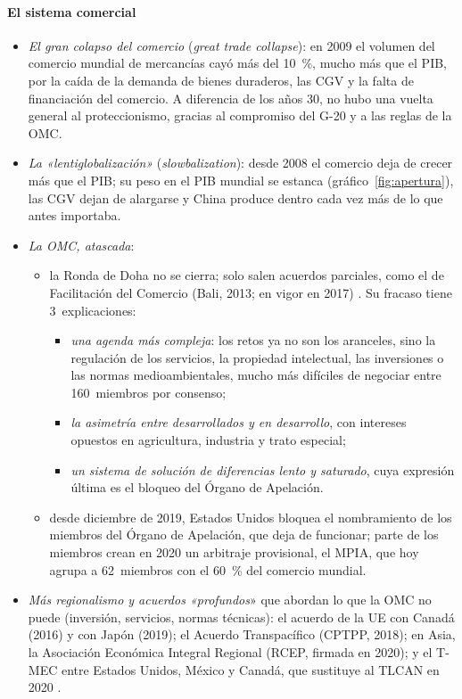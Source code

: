 \documentclass[11pt]{article}
\begin{document}
\paragraph{El sistema comercial}

\begin{itemize}
\item \emph{El gran colapso del comercio} (\emph{great trade collapse}): en 2009 el volumen del comercio mundial de mercancías cayó más del 10~\%, mucho más que el PIB, por la caída de la demanda de bienes duraderos, las CGV y la falta de financiación del comercio. A diferencia de los años 30, no hubo una vuelta general al proteccionismo, gracias al compromiso del G-20 y a las reglas de la OMC.
\item \emph{La «lentiglobalización»} (\emph{slowbalization}): desde 2008 el comercio deja de crecer más que el PIB; su peso en el PIB mundial se estanca (gráfico~\ref{fig:apertura}), las CGV dejan de alargarse y China produce dentro cada vez más de lo que antes importaba.
\item \emph{La OMC, atascada}:
  \begin{itemize}
  \item la Ronda de Doha no se cierra; solo salen acuerdos parciales, como el de Facilitación del Comercio (Bali, 2013; en vigor en 2017) . Su fracaso tiene 3~explicaciones:
    \begin{itemize}
    \item \emph{una agenda más compleja}: los retos ya no son los aranceles, sino la regulación de los servicios, la propiedad intelectual, las inversiones o las normas medioambientales, mucho más difíciles de negociar entre 160~miembros por consenso;
    \item \emph{la asimetría entre desarrollados y en desarrollo}, con intereses opuestos en agricultura, industria y trato especial;
    \item \emph{un sistema de solución de diferencias lento y saturado}, cuya expresión última es el bloqueo del Órgano de Apelación.
    \end{itemize}
  \item desde diciembre de 2019, Estados Unidos bloquea el nombramiento de los miembros del Órgano de Apelación, que deja de funcionar; parte de los miembros crean en 2020 un arbitraje provisional, el MPIA, que hoy agrupa a 62~miembros con el 60~\% del comercio mundial\nocite{CE2026MPIA}.
  \end{itemize}
\item \emph{Más regionalismo y acuerdos «profundos}» que abordan lo que la OMC no puede (inversión, servicios, normas técnicas): el acuerdo de la UE con Canadá (2016) y con Japón (2019); el Acuerdo Transpacífico (CPTPP, 2018); en Asia, la Asociación Económica Integral Regional (RCEP, firmada en 2020); y el T-MEC entre Estados Unidos, México y Canadá, que sustituye al TLCAN en 2020 .

\end{itemize}
\end{document}
